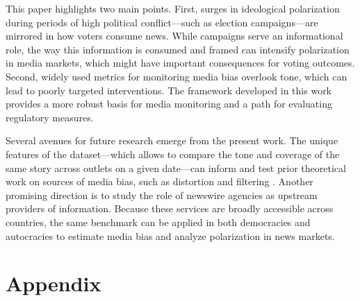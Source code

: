 \documentclass[12pt]{article}
\begin{document}
This paper highlights two main points. First, surges in ideological polarization during periods of high political conflict—such as election campaigns—are mirrored in how voters consume news. While campaigns serve an informational role, the way this information is consumed and framed can intensify polarization in media markets, which might have important consequences for voting outcomes. Second, widely used metrics for monitoring media bias overlook tone, which can lead to poorly targeted interventions. The  framework developed in this work provides a more robust basis for media monitoring and a path for evaluating regulatory measures.



Several avenues for future research emerge from the present work. The unique features of the dataset—which allows to compare the tone and coverage of the same story across outlets on a given date—can inform and test prior theoretical work on sources of media bias, such as distortion and filtering \citep[][]{gentzkow2014media}. Another promising direction is to study the role of newswire agencies as  upstream providers of information.  Because these services are broadly accessible across countries, the same benchmark can be applied in both democracies and autocracies to estimate media bias and analyze polarization in news markets.







	
	
	
	
	\clearpage
	
	\pagestyle{plain}  
	
		
	
	
	
	\clearpage

\appendix

\part{Appendix} %

\parttoc %


\renewcommand\thefigure{\thesection.\arabic{figure}}   
\renewcommand\thetable{\thesection.\arabic{table}}
\setcounter{table}{0}
\end{document}
